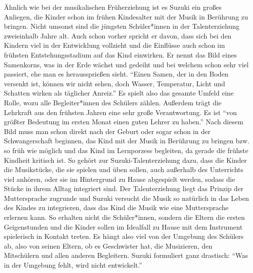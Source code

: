 Ähnlich wie bei der musikalischen Früherziehung ist es Suzuki ein großes
Anliegen, die Kinder schon im frühen Kindesalter mit der Musik in Berührung zu
bringen. Nicht umsonst sind die jüngsten Schüler*innen in der Talenterziehung
zweieinhalb Jahre alt. Auch schon vorher spricht er davon, dass sich bei den
Kindern viel in der Entwicklung vollzieht und die Einflüsse auch schon im
frühsten Entstehungsstadium auf das Kind einwirken. Er nennt das Bild eines
Samenkorns, was in der Erde wächst und gedeiht und bei welchem schon sehr viel
passiert, ehe man es heraussprießen sieht. \enquote{Einen Samen, der in den
Boden versenkt ist, können wir nicht sehen, doch Wasser, Temperatur, Licht und
Schatten wirken als täglicher Anreiz.}\autocite[17]{suzuki:erziehung_ist_liebe}
Es spielt also das gesamte Umfeld eine Rolle, wozu alle Begleiter*innen des
Schülers zählen. Außerdem trägt die Lehrkraft aus den frühsten Jahren eine sehr
große Verantwortung. Es ist
\enquote{von größter Bedeutung im ersten Monat einen guten Lehrer zu haben.}
\autocite[21]{suzuki:erziehung_ist_liebe} Nach diesem Bild muss man schon direkt
nach der Geburt oder sogar schon in der Schwangerschaft beginnen, das Kind mit
der Musik in Berührung zu bringen bzw. so früh wie möglich und das Kind im
Lernporzess begleiten, da gerade die frühste Kindheit kritisch ist.
\autocite[25]{suzuki:erziehung_ist_liebe} So gehört zur Suzuki-Talenterziehung
dazu, dass die Kinder die Musikstücke, die sie spielen und üben sollen, auch
außerhalb des Unterrichts viel anhören, oder sie im Hintergrund zu Hause
abgespielt werden, sodass die Stücke in ihrem Alltag integriert sind. Der
Talenterziehung liegt das Prinzip der Muttersprache zugrunde und Suzuki versucht
die Musik so natürlich in das Leben des Kindes zu integrieren, dass das Kind die
Musik wie eine Muttersprache erlernen kann.  So erhalten nicht die
Schüler*innen, sondern die Eltern die ersten Geigenstunden und die Kinder sollen
im Idealfall zu Hause mit dem Instrument spielerisch in Kontakt treten.
\autocite[75]{suzuki:erziehung_ist_liebe} Es hängt also viel von der Umgebung
des Schülers ab, also von seinen Eltern, ob es Geschwister hat, die Musizieren,
den Mitschülern und allen anderen Begleitern. Suzuki formuliert ganz drastisch:
\enquote{Was in der Umgebung fehlt, wird nicht entwickelt.}
\autocite[25]{suzuki:erziehung_ist_liebe}

